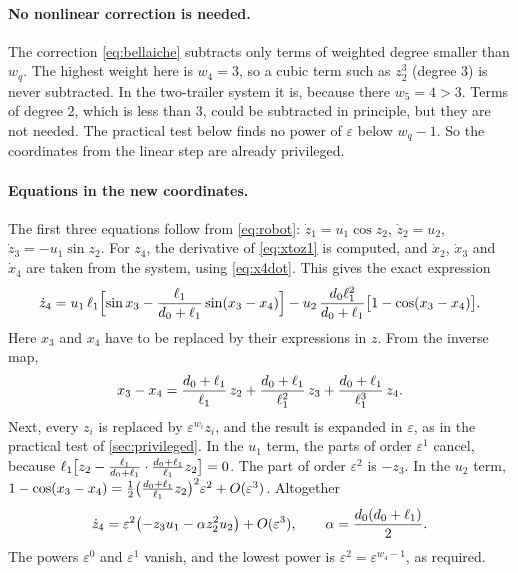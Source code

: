 \paragraph{No nonlinear correction is needed.}
The correction \eqref{eq:bellaiche} subtracts only terms of weighted degree
smaller than $w_q$. The highest weight here is $w_4=3$, so a cubic term such as
$z_2^3$ (degree $3$) is never subtracted. In the two-trailer system it is,
because there $w_5=4>3$. Terms of degree $2$, which is less than $3$, could be
subtracted in principle, but they are not needed. The practical test below finds
no power of $\varepsilon$ below $w_q-1$. So the coordinates from the linear step
are already privileged.

\paragraph{Equations in the new coordinates.}
The first three equations follow from \eqref{eq:robot}:
$\dot z_1=u_1\cos z_2$, $\dot z_2=u_2$, $\dot z_3=-u_1\sin z_2$.
For $z_4$, the derivative of \eqref{eq:xtoz1} is computed, and $\dot x_2$,
$\dot x_3$ and $\dot x_4$ are taken from the system, using \eqref{eq:x4dot}.
This gives the exact expression
\begin{equation}
  \dot z_4=u_1\,\ell_1\Bigl[\sin x_3-\frac{\ell_1}{d_0+\ell_1}\sin(x_3-x_4)\Bigr]
  -u_2\,\frac{d_0\ell_1^{2}}{d_0+\ell_1}\bigl[1-\cos(x_3-x_4)\bigr].
  \label{eq:z4dot}
\end{equation}
Here $x_3$ and $x_4$ have to be replaced by their expressions in $z$. From the
inverse map,
\begin{equation}
  x_3-x_4=\frac{d_0+\ell_1}{\ell_1}\,z_2+\frac{d_0+\ell_1}{\ell_1^{2}}\,z_3
          +\frac{d_0+\ell_1}{\ell_1^{3}}\,z_4 .
\end{equation}
Next, every $z_i$ is replaced by $\varepsilon^{w_i}z_i$, and the result is
expanded in $\varepsilon$, as in the practical test of \cref{sec:privileged}. In
the $u_1$ term, the parts of order $\varepsilon^1$ cancel, because
$\ell_1\bigl[z_2-\frac{\ell_1}{d_0+\ell_1}\cdot\frac{d_0+\ell_1}{\ell_1}z_2\bigr]=0$.
The part of order $\varepsilon^2$ is $-z_3$. In the $u_2$ term,
$1-\cos(x_3-x_4)=\tfrac12\bigl(\tfrac{d_0+\ell_1}{\ell_1}z_2\bigr)^2\varepsilon^2
+O(\varepsilon^3)$. Altogether
\begin{equation}
  \dot z_4=\varepsilon^2\bigl(-z_3u_1-\alpha z_2^2u_2\bigr)+O(\varepsilon^3),
  \qquad
  \alpha=\frac{d_0(d_0+\ell_1)}{2}.
  \label{eq:alpha1}
\end{equation}
The powers $\varepsilon^0$ and $\varepsilon^1$ vanish, and the lowest power is
$\varepsilon^2=\varepsilon^{w_4-1}$, as required.

